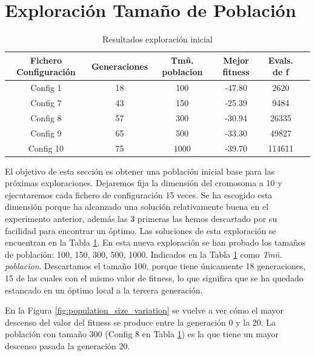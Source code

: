 \section{Exploración Tamaño de Población}

\begin{table}[]
    \centering
    \begin{tabular}{||c|c|c|c|c|c||}
        \hline
        \textbf{Fichero Configuración} & \textbf{Generaciones} & \textbf{Tmñ. poblacion} & \textbf{Mejor fitness} & \textbf{Evals. de f}\\ \hline
        Config 1   & 18    & 100   & -47.80    &  2620   \\ \hline
        Config 7   & 43    & 150   & -25.39    &  9484   \\ \hline
        Config 8   & 57    & 300   & -30.94    &  26335  \\ \hline
        Config 9   & 65    & 500   & -33.30    &  49827  \\ \hline
        Config 10  & 75    & 1000  & -39.70    &  114611 \\ \hline
    \end{tabular}
    \caption{Resultados exploración inicial}
    \label{tab:base_population}
\end{table}

El objetivo de esta sección es obtener una población inicial base para las próximas exploraciones. Dejaremos fija la dimensión del cromosoma a 10 y
ejecutaremos cada fichero de configuración 15 veces. Se ha escogido esta dimensión porque ha alcanzado una solución 
relativamente buena en el experimento anterior, además las 3 primeras las hemos descartado por su facilidad para encontrar un 
óptimo. Las soluciones de esta exploración se encuentran en la Tabla \ref{tab:base_population}. En esta nueva exploración se 
han probado los tamaños de población: 100, 150, 300, 500, 1000. Indicados en la Tabla \ref{tab:base_population}
como \textit{Tmñ. poblacion}. Descartamos el tamaño 100, porque tiene únicamente 18 generaciones, 15 de las cuales con el mismo
valor de fitness, lo que significa que se ha quedado estancado en un óptimo local a la tercera generación.

En la Figura \ref{fig:population_size_variation} se vuelve a ver cómo el mayor descenso del valor del fitness se produce
entre la generación 0 y la 20. La población con tamaño 300 (Config 8 en Tabla \ref{tab:base_population}) es la que tiene
un mayor descenso pasada la generación 20. 

